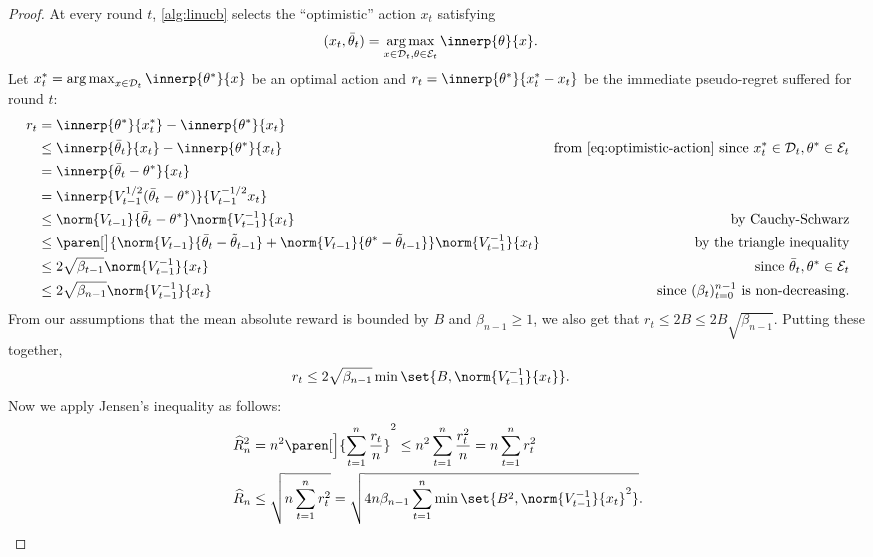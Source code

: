 \documentclass{article}
\newcommand{\inv}[1]{#1^{-1}}
\DeclareMathOperator*{\argmax}{arg\,max}
\DeclarePairedDelimiter{\paren}()
\newcommand{\Dset}[1]{\mathcal{D}_{#1}}
\newcommand{\Eset}[1]{\mathcal{E}_{#1}}
\begin{document}
\begin{proof}
  At every round $t$, \cref{alg:linucb} selects the ``optimistic''
  action $x_t$ satisfying
  \begin{align}\label{eq:optimistic-action}
    (x_t,\bar\theta_t) &= \argmax_{x\in\Dset{t},\theta\in\Eset{t}} \innerp{\theta}{x}.
  \end{align}
  Let $x_t^* = \argmax_{x\in\Dset{t}}\innerp{\theta^*}{x}$ be an optimal
  action and $r_t = \innerp{\theta^*}{x_t^*-x_t}$ be the immediate
  pseudo-regret suffered for round $t$:
  \begin{align*}
    r_t &= \innerp{\theta^*}{x_t^*} - \innerp{\theta^*}{x_t} \\
        &\le \innerp{\bar\theta_t}{x_t} - \innerp{\theta^*}{x_t}
        &\text{from \eqref{eq:optimistic-action} since }
          x_t^*\in\Dset{t}, \theta^*\in\Eset{t} \\
        &= \innerp{\bar\theta_t - \theta^*}{x_t} \\
        &= \innerp{V_{t-1}^{1/2}(\bar\theta_t - \theta^*)}{V_{t-1}^{-1/2}x_t} \\
        &\le \norm{V_{t-1}}{\bar\theta_t - \theta^*}\norm{\inv{V_{t-1}}}{x_t}
        &\text{by Cauchy-Schwarz}\\
        &\le \paren[\big]{\norm{V_{t-1}}{\bar\theta_t - \tilde\theta_{t-1}}
          + \norm{V_{t-1}}{\theta^* - \tilde\theta_{t-1}}}\norm{\inv{V_{t-1}}}{x_t}
        &\text{by the triangle inequality}\\
        &\le 2\sqrt{\beta_{t-1}}\norm{\inv{V_{t-1}}}{x_t}
        &\text{since } \bar\theta_t, \theta^* \in \Eset{t} \\
        &\le 2\sqrt{\beta_{n-1}}\norm{\inv{V_{t-1}}}{x_t}
        &\text{since } (\beta_t)_{t=0}^{n-1} \text{ is non-decreasing.}
  \end{align*}
  From our assumptions that the mean absolute reward is bounded by $B$
  and $\beta_{n-1} \ge 1$, we also get that
  $r_t \le 2B \le 2B\sqrt{\beta_{n-1}}$.  Putting these together,
  \begin{align*}
    r_t &\le 2\sqrt{\beta_{n-1}} \min\set{B, \norm{\inv{V_{t-1}}}{x_t}}.
  \end{align*}
  Now we apply Jensen's inequality as follows:
  \begin{align*}
    \widehat R_n^2 &= n^2 \paren[\Big]{\sum_{t=1}^n \frac{r_t}{n}}^2
                   \le n^2 \sum_{t=1}^n \frac{r_t^2}{n} = n\sum_{t=1}^nr_t^2 \\
    \widehat R_n &\le \sqrt{n\sum_{t=1}^n r_t^2}
                   = \sqrt{4n\beta_{n-1} \sum_{t=1}^n\min\set{B^2, \norm{\inv{V_{t-1}}}{x_t}^2}}.
                   \qedhere
  \end{align*}
\end{proof}
\end{document}
